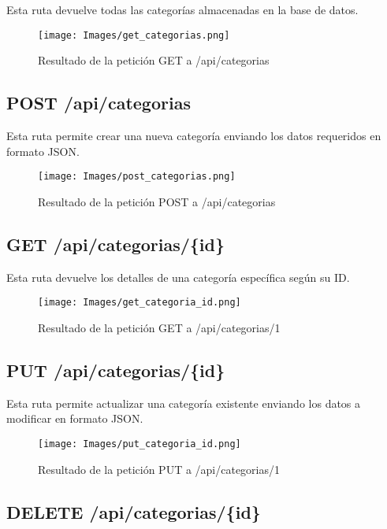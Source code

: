 \documentclass{article}
\begin{document}
Esta ruta devuelve todas las categorías almacenadas en la base de datos.

\begin{figure}[h]
\centering
\texttt{[image: Images/get\_categorias.png]}
\caption{Resultado de la petición GET a /api/categorias}
\end{figure}

\subsection{POST /api/categorias}

Esta ruta permite crear una nueva categoría enviando los datos requeridos en formato JSON.

\begin{figure}[h]
\centering
\texttt{[image: Images/post\_categorias.png]}
\caption{Resultado de la petición POST a /api/categorias}
\end{figure}

\subsection{GET /api/categorias/\{id\}}

Esta ruta devuelve los detalles de una categoría específica según su ID.

\begin{figure}[h]
\centering
\texttt{[image: Images/get\_categoria\_id.png]}
\caption{Resultado de la petición GET a /api/categorias/1}
\end{figure}

\subsection{PUT /api/categorias/\{id\}}

Esta ruta permite actualizar una categoría existente enviando los datos a modificar en formato JSON.

\begin{figure}[h]
\centering
\texttt{[image: Images/put\_categoria\_id.png]}
\caption{Resultado de la petición PUT a /api/categorias/1}
\end{figure}

\subsection{DELETE /api/categorias/\{id\}}
\end{document}
